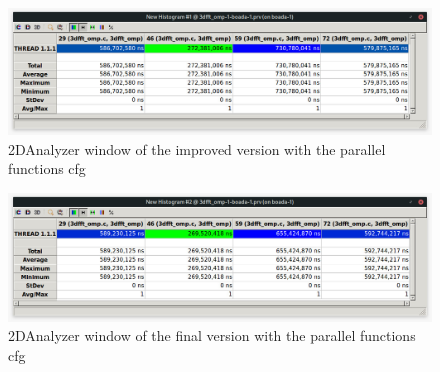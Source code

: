 \begin{figure}[H]%
    \centering
    \includegraphics[width=\textwidth]{./data/omp2.jpeg}
    \caption{2DAnalyzer window of the improved version with the parallel functions cfg}%
    \label{fig:omp2}
\end{figure}

\begin{figure}[H]%
    \centering
    \includegraphics[width=\textwidth]{./data/omp3.jpeg}
    \caption{2DAnalyzer window of the final version with the parallel functions cfg}%
    \label{fig:omp3}
\end{figure}



